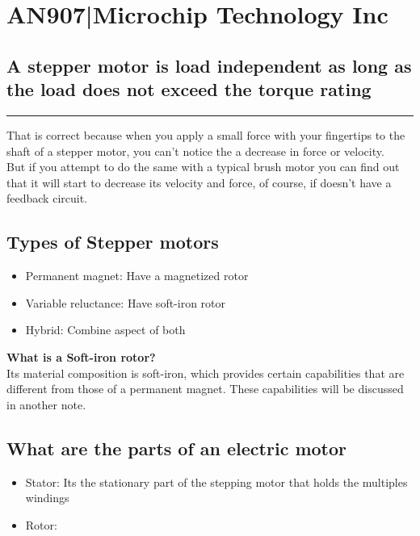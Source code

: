 \documentclass{report}
\newenvironment{doubt}{
  \begin{tcolorbox}[colback=blue!10, colframe=blue!40!black, title=Doubt]
}{
  \end{tcolorbox}
}
\begin{document}
\section{AN907|Microchip Technology Inc}

\subsection*{A stepper motor is load independent as long as the load does not exceed the torque rating}
\hrule
\vspace{4pt}
That is correct because when you apply a small force with your fingertips to the shaft of
a stepper motor, you can't notice the a decrease in force or velocity.\\
But if you attempt to do the same with a typical brush motor you can find out that it will
start to decrease its velocity and force, of course, if doesn't have a feedback circuit.

 
\subsection*{Types of Stepper motors}
\begin{itemize}
	\item Permanent magnet: Have a magnetized rotor
	\item Variable reluctance: Have soft-iron rotor
	\item Hybrid: Combine aspect of both
\end{itemize}

\begin{doubt}
	\textbf{What is a Soft-iron rotor?}\\
	Its material composition is soft-iron, which provides certain capabilities that are different
	from those of a permanent magnet. These capabilities will be discussed in another note.
\end{doubt}

\subsection*{What are the parts of an electric motor}
\begin{itemize}
  \item Stator: Its the stationary part of the stepping motor that holds the multiples windings
  \item Rotor:
\end{itemize}
\end{document}
